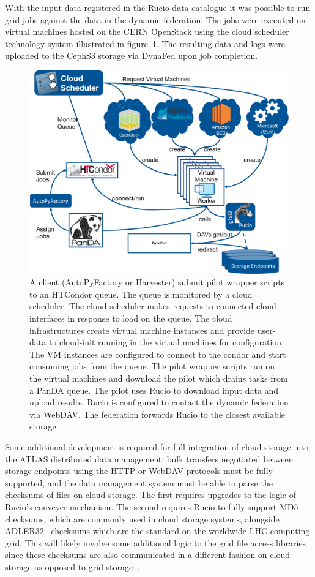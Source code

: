 \documentclass[a4paper]{jpconf}
\begin{document}
With the input data registered in the Rucio data catalogue it was possible to run grid jobs against the data in the dynamic federation. The jobs were executed on virtual machines hosted on the CERN OpenStack using the cloud scheduler technology system illustrated in figure~\ref{fig:atlas-cloud}. The resulting data and logs were uploaded to the CephS3 storage via DynaFed upon job completion.


\begin{figure}
  \includegraphics[width=\textwidth]{atlas-cloud-system.png}
  \caption{A client (AutoPyFactory or Harvester) submit pilot wrapper scripts to an HTCondor queue. The queue is monitored by a cloud scheduler. The cloud scheduler makes requests to connected cloud interfaces in response to load on the queue. The cloud infrastructures create virtual machine instances and provide user-data to cloud-init running in the virtual machines for configuration. The VM instances are configured to connect to the condor and start consuming jobs from the queue. The pilot wrapper scripts run on the virtual machines and download the pilot which drains tasks from a PanDA queue. The pilot uses Rucio to download input data and upload results. Rucio is configured to contact the dynamic federation via WebDAV. The federation forwards Rucio to the closest available storage.}
  \label{fig:atlas-cloud}
\end{figure}

Some additional development is required for full integration of cloud storage into the ATLAS distributed data management: bulk transfers negotiated between storage endpoints using the HTTP or WebDAV protocols must be fully supported, and the data management system must be able to parse the checksums of files on cloud storage. The first requires upgrades to the logic of Rucio's conveyer mechanism. The second requires Rucio to fully support MD5~\cite{md5} checksums, which are commonly used in cloud storage systems, alongside ADLER32~\cite{adler32} checksums which are the standard on the worldwide LHC computing grid. This will likely involve some additional logic to the grid file access libraries since these checksums are also communicated in a different fashion on cloud storage as opposed to grid storage~\cite{content-md5, request-digest}.
\end{document}

